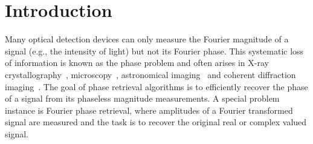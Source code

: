 




\section{Introduction}

Many optical detection devices can only measure the Fourier magnitude of a signal (e.g., the intensity of light) but not its Fourier phase. This systematic loss of information is known as the phase problem and often arises in X-ray crystallography~\cite{Millane:90}, microscopy~\cite{mico}, astronomical imaging~\cite{Fienup:19} and coherent diffraction imaging~\cite{doi:10.1137/151005099}. The goal of phase retrieval algorithms is to efficiently recover the phase of a signal from its phaseless magnitude measurements. A special problem instance is Fourier phase retrieval, where amplitudes of a Fourier transformed signal are measured and the task is to recover the original real or complex valued signal.

